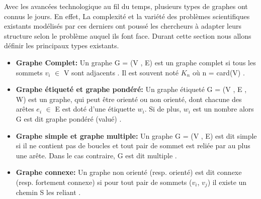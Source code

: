 
	Avec les avancées technologique au fil du temps, plusieurs types de graphes ont connus le jours. En effet, La complexité et la variété des problèmes scientifiques existants modélisés par ces derniers ont poussé les chercheurs à adapter leurs structure selon le problème auquel  ils font face. Durant cette section nous allons définir les principaux types existants.
	
		\begin{itemize}[label=$\circ$]
		
			\item \textbf{Graphe Complet:} Un graphe G = (V , E) est un graphe complet si tous les sommets $v_{i}$ $\in$ V sont adjacents \citep{Pres}. Il est souvent noté $K_{n}$ où n = card(V) \citep{DUT}.
				
			
			\item \textbf{Graphe étiqueté et graphe pondéré:}
			 Un graphe étiqueté G = (V , E , W) est un graphe, qui peut être orienté ou non orienté, dont chacune des arêtes $e_{i}$ $\in$ E est doté d'une étiquette $w_{i}$. Si de plus, $w_{i}$ est un nombre alors G est dit graphe pondéré (valué) \citep{DUT}.
		
			\item \textbf{Graphe simple et graphe multiple:}
			Un graphe G = (V , E) est dit simple si il ne contient pas de boucles et tout pair de sommet est reliée par au plus une arête. Dans le cas contraire, G est dit multiple \citep{IUTLyonInformatique}.
			
			\item \textbf{Graphe connexe:}
			Un graphe non orienté (resp. orienté) est dit connexe (resp. fortement connexe) si pour tout pair de sommets ($v_{i}$, $v_{j}$) il existe un chemin S les reliant \citep{muller}.
		\end{itemize}
		